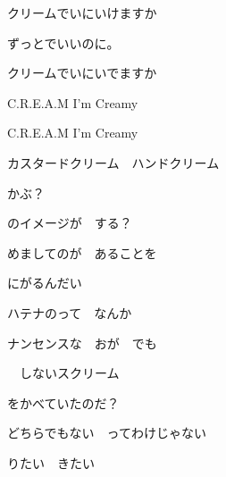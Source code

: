\documentclass[a4paper,tate,twocolumn,12pt]{ltjtarticle}
\begin{document}
\thispagestyle{empty}

\begin{center}
{\LARGE クリームでいにいけますか}

{\large ずっとでいいのに。}
\end{center}

\vspace{1em}

\begin{flushleft}

\noindent\begin{minipage}{\linewidth}
クリームでいにいでますか

C.R.E.A.M I'm Creamy

C.R.E.A.M I'm Creamy
\end{minipage}

\vspace{2em}

\noindent\begin{minipage}{\linewidth}
カスタードクリーム　ハンドクリーム

かぶ？

のイメージが　する？

めましてのが　あることを

にがるんだい
\end{minipage}

\vspace{2em}

\noindent\begin{minipage}{\linewidth}
ハテナのって　なんか

ナンセンスな　おが　でも

　しないスクリーム

をかべていたのだ？
\end{minipage}

\vspace{2em}

\noindent\begin{minipage}{\linewidth}
どちらでもない　ってわけじゃない

りたい　きたい


\end{minipage}
\end{flushleft}
\end{document}
